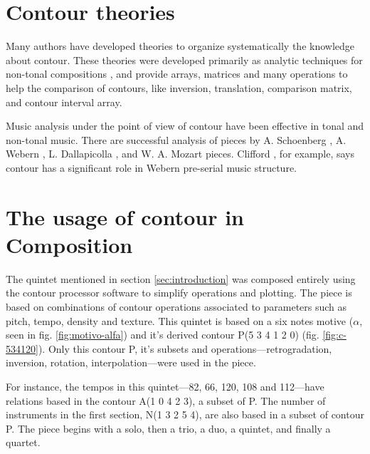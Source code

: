 \section{Contour theories}
\label{sec:contour-theories}

Many authors
\cite{friedmann85:methodology,friedmann87:response,morris87:composition,morris93:directions,marvin.ea87:relating,marvin88:generalized,marvin.ea95:generalization,polansky.ea92:possible,quinn97:fuzzy,clifford95:contour,beard03:contour}
have developed theories to organize systematically the knowledge about
contour. These theories were developed primarily as analytic
techniques for non-tonal compositions \cite{beard03:contour}, and
provide arrays, matrices and many operations to help the comparison of
contours, like inversion, translation, comparison matrix, and contour
interval array.

Music analysis under the point of view of contour have been effective
in tonal and non-tonal music. There are successful analysis of pieces
by A. Schoenberg \cite{friedmann85:methodology}, A. Webern
\cite{clifford95:contour}, L. Dallapicolla
\cite{marvin88:generalized}, and W. A. Mozart \cite{beard03:contour}
pieces. Clifford \cite{clifford95:contour}, for example, says contour
has a significant role in Webern pre-serial music structure.

\section{The usage of contour in Composition}
\label{sec:contour-composition}

The quintet mentioned in section \ref{sec:introduction} was composed
entirely using the contour processor software to simplify operations
and plotting. The piece is based on combinations of contour operations
associated to parameters such as pitch, tempo, density and texture.
This quintet is based on a six notes motive ($\alpha$, seen in fig.
\ref{fig:motivo-alfa}) and it's derived contour P(5 3 4 1 2 0) (fig.
\ref{fig:c-534120}). Only this contour P, it's subsets and
operations---retrogradation, inversion, rotation, interpolation---were
used in the piece.

For instance, the tempos in this quintet---82, 66, 120, 108 and
112---have relations based in the contour A(1 0 4 2 3), a subset of P.
The number of instruments in the first section, N(1 3 2 5 4), are also
based in a subset of contour P. The piece begins with a solo, then a
trio, a duo, a quintet, and finally a quartet.

